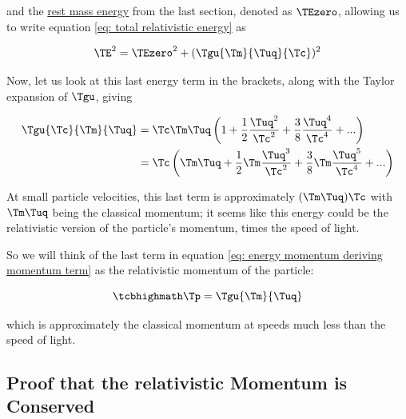 \begin{derivation}
	and the \hyperlink{def-rest-mass-energy}{rest mass energy} from the last section, denoted as $\TEzero $, allowing us to write equation \eqref{eq: total relativistic energy} as

	\begin{equation}
		\label{eq: energy momentum deriving momentum term}
		\TE ^2 = \TEzero ^2 + (\Tgu {\Tm }{\Tuq }{\Tc })^2
	\end{equation}

	Now, let us look at this last energy term in the brackets, along with the Taylor expansion of $\Tgu $, giving

	\begin{equation}
		\begin{aligned}
			\Tgu  {\Tc }{\Tm }{\Tuq } & = {\Tc }{\Tm }{\Tuq } \left(1 + \frac{1}{2}\frac{\Tuq ^2}{ \Tc ^2} + \frac{3}{8}\frac{\Tuq ^4}{\Tc ^4} + ...
			\right)                                                                                                               \\
			                       & ={\Tc }\left( {\Tm }{\Tuq } + \frac{1}{2}\Tm  \frac{\Tuq ^3}{ \Tc ^2} + \frac{3}{8}\Tm \frac{\Tuq ^5}{\Tc ^4} + ...
			\right)
		\end{aligned}
	\end{equation}

	At small particle velocities, this last term is approximately $({\Tm }{\Tuq }){\Tc }$ with ${\Tm }{\Tuq }$ being the classical momentum; it seems like this energy could be the relativistic version of the particle's momentum, times the speed of light.

\end{derivation}

So we will think of the last term in equation \eqref{eq: energy momentum deriving momentum term} as the relativistic momentum of the particle:

\begin{equation}
	\label{eq: relativistic momentum}
	\mhl{
		\Tp  = \Tgu  {\Tm }{\Tuq }
	}
\end{equation}

which is approximately the classical momentum at speeds much less than the speed of light.

\subsection{Proof that the relativistic Momentum is Conserved}\label{subsect: Proof the this relativistic Momentum is Conserved}


